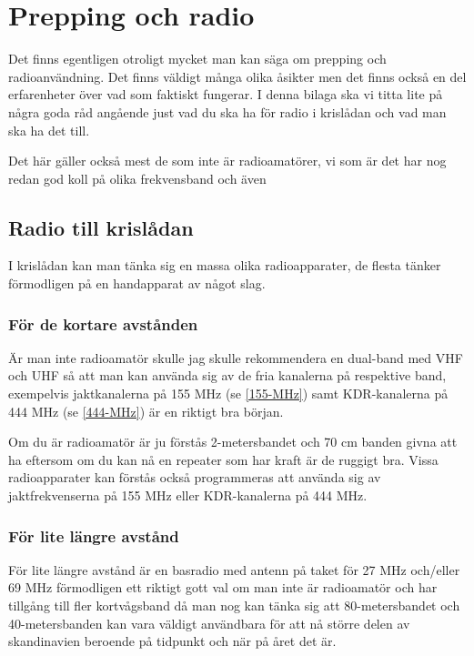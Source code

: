 
\appendix

\chapter{Prepping och radio}

Det finns egentligen otroligt mycket man kan säga om prepping och
radioanvändning. Det finns väldigt många olika åsikter men det finns också en
del erfarenheter över vad som faktiskt fungerar. I denna bilaga ska vi titta
lite på några goda råd angående just vad du ska ha för radio i krislådan och
vad man ska ha det till.

Det här gäller också mest de som inte är radioamatörer, vi som är det har nog
redan god koll på olika frekvensband och även


\section{Radio till krislådan}

I krislådan kan man tänka sig en massa olika radioapparater, de flesta tänker
förmodligen på en handapparat av något slag.

\subsection{För de kortare avstånden}

Är man inte radioamatör skulle jag skulle rekommendera en dual-band med VHF
och UHF så att man kan använda sig av de fria kanalerna på respektive band,
exempelvis jaktkanalerna på 155 MHz (se \ref{155-MHz})  samt KDR-kanalerna på
444 MHz (se \ref{444-MHz}) är en riktigt bra början.

Om du är radioamatör är ju förstås 2-metersbandet och 70 cm banden givna att
ha eftersom om du kan nå en repeater som har kraft är de ruggigt bra. Vissa
radioapparater kan förstås också programmeras att använda sig av
jaktfrekvenserna på 155 MHz eller KDR-kanalerna på 444 MHz.

\subsection{För lite längre avstånd}

För lite längre avstånd är en basradio med antenn på taket för 27 MHz
och/eller 69 MHz förmodligen ett riktigt gott val om man inte är radioamatör
och har tillgång till fler kortvågsband då man nog kan tänka sig att
80-metersbandet och 40-metersbanden kan vara väldigt användbara för att nå
större delen av skandinavien beroende på tidpunkt och när på året det är.

